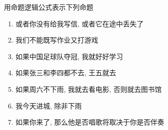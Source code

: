 \begin{frame}{}
  \begin{exampleblock}{用命题逻辑公式表示下列命题}
    \begin{enumerate}[<+->][(1)]
      \setlength{\itemsep}{8pt}
      \item 或者你没有给我写信, 或者它在途中丢失了
      \item 我们不能既写作业又打游戏
      \item 如果中国足球队夺冠, 我就好好学习
      \item 如果张三和李四都不去, 王五就去
      \item 如果周六不下雨, 我就去看电影, 否则就去图书馆
      \item 我今天进城, 除非下雨
      \item 如果你来了, 那么他是否唱歌将取决于你是否伴奏
    \end{enumerate}
  \end{exampleblock}
\end{frame}
